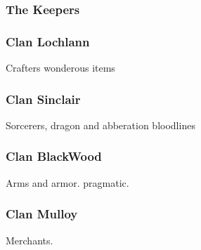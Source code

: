 		\subsubsection{The Keepers}
		
		\subsubsection{Clan Lochlann}
			Crafters wonderous items

		\subsubsection{Clan Sinclair}
			Sorcerers, dragon and abberation bloodlines

		\subsubsection{Clan BlackWood}
			Arms and armor. pragmatic.

		\subsubsection{Clan Mulloy}
			Merchants.

